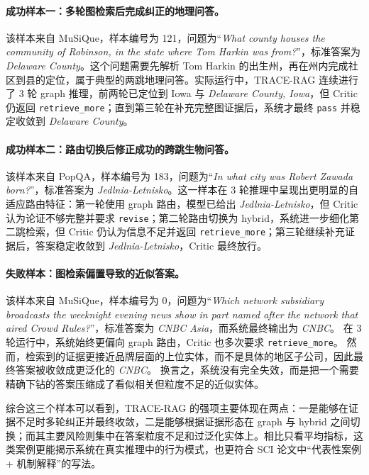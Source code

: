﻿\documentclass[UTF8,11pt,twocolumn]{ctexart}
\begin{document}
\paragraph{成功样本一：多轮图检索后完成纠正的地理问答。}
该样本来自 MuSiQue，样本编号为 121，问题为“\emph{What county houses the community of Robinson, in the state where Tom Harkin was from?}”，标准答案为 \emph{Delaware County}。这个问题需要先解析 Tom Harkin 的出生州，再在州内完成社区到县的定位，属于典型的两跳地理问答。实际运行中，TRACE-RAG 连续进行了 3 轮 graph 推理，前两轮已定位到 Iowa 与 \emph{Delaware County, Iowa}，但 Critic 仍返回 \texttt{retrieve\_more}；直到第三轮在补充完整图证据后，系统才最终 \texttt{pass} 并稳定收敛到 \emph{Delaware County}。

\paragraph{成功样本二：路由切换后修正成功的跨跳生物问答。}
该样本来自 PopQA，样本编号为 183，问题为“\emph{In what city was Robert Zawada born?}”，标准答案为 \emph{Jedlnia-Letnisko}。这一样本在 3 轮推理中呈现出更明显的自适应路由特征：第一轮使用 graph 路由，模型已给出 \emph{Jedlnia-Letnisko}，但 Critic 认为论证不够完整并要求 \texttt{revise}；第二轮路由切换为 hybrid，系统进一步细化第二跳检索，但 Critic 仍认为信息不足并返回 \texttt{retrieve\_more}；第三轮继续补充证据后，答案稳定收敛到 \emph{Jedlnia-Letnisko}，Critic 最终放行。

\paragraph{失败样本：图检索偏置导致的近似答案。}
该样本来自 MuSiQue，样本编号为 0，问题为“\emph{Which network subsidiary broadcasts the weeknight evening news show in part named after the network that aired Crowd Rules?}”，标准答案为 \emph{CNBC Asia}，而系统最终输出为 \emph{CNBC}。
在 3 轮运行中，系统始终更偏向 graph 路由，Critic 也多次要求 \texttt{retrieve\_more}。
然而，检索到的证据更接近品牌层面的上位实体，而不是具体的地区子公司，因此最终答案被收敛成更泛化的 \emph{CNBC}。
换言之，系统没有完全失效，而是把一个需要精确下钻的答案压缩成了看似相关但粒度不足的近似实体。

综合这三个样本可以看到，TRACE-RAG 的强项主要体现在两点：一是能够在证据不足时多轮纠正并最终收敛，二是能够根据证据形态在 graph 与 hybrid 之间切换；而其主要风险则集中在答案粒度不足和过泛化实体上。相比只看平均指标，这类案例更能揭示系统在真实推理中的行为模式，也更符合 SCI 论文中“代表性案例 + 机制解释”的写法。
\end{document}
